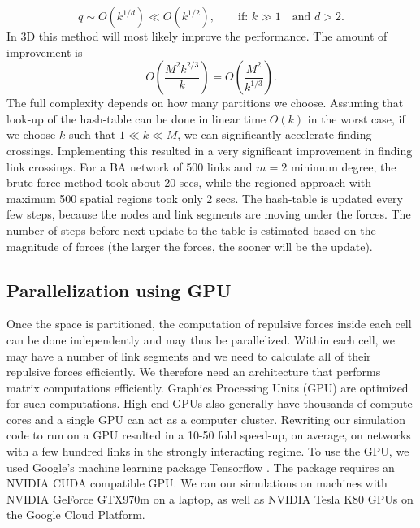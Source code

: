 \documentclass[endfloats,nofootinbib,preprint,floatfix,titlepage,superscriptaddress,linenumbers]{revtex4-1} %
\begin{document}
$$ q \sim O(k^{1/d}) \ll O(k^{1/2}), \qquad \mbox{if: } k\gg1 \quad \mbox{and } d> 2.$$ 
In 3D this method will most likely improve the performance. The amount of improvement is
$$ O\left( \frac{M^2 k^{2/3} }{ k} \right) = O\left(\frac{M^2}{ k^{1/3}} \right). $$
The full complexity depends on how many partitions we choose. 
Assuming that look-up of the hash-table can be done in linear time $O(k)$ in the worst case, if we choose $ k$ such that $1\ll k \ll M$, we can significantly accelerate finding crossings.  
Implementing this resulted in a very significant improvement in finding link crossings. For a BA network of 500 links and $m=2$ minimum degree, the brute force method took about 20 secs, while the regioned approach with maximum 500 spatial regions took only 2 secs. 
The hash-table is updated every few steps, because the nodes and link segments are moving under the forces. 
The number of steps before next update to the table is estimated based on the magnitude of forces (the larger the forces, the sooner will be the update).


\subsection{Parallelization using GPU}
Once the space is partitioned, the computation of repulsive forces inside each cell can be done independently and may thus be parallelized. 
Within each cell, we may have a number of link segments and we need to calculate all of their repulsive forces efficiently. 
We therefore need an architecture that performs matrix computations efficiently. 
Graphics Processing Units (GPU) are optimized for such computations. 
High-end GPUs also generally have thousands of compute cores and a single GPU can act as a computer cluster.
Rewriting our simulation code to run on a GPU resulted in a 10-50 fold speed-up, on average, on networks with a few hundred links in the strongly interacting regime. 
To use the GPU, we used Google's machine learning package Tensorflow \citep{tensorflow2015-whitepaper}. 
The package requires an NVIDIA CUDA compatible GPU. 
We ran our simulations on machines with NVIDIA GeForce GTX970m on a laptop, as well as NVIDIA Tesla K80 GPUs on the Google Cloud Platform. 
\end{document}

